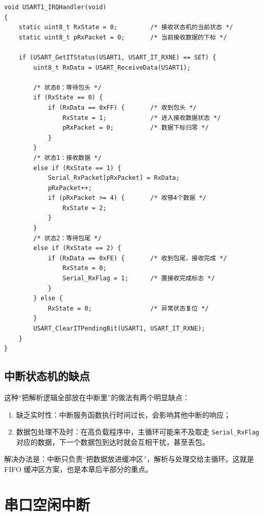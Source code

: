\begin{lstlisting}[style=c]
void USART1_IRQHandler(void)
{
    static uint8_t RxState = 0;         /* 接收状态机的当前状态 */
    static uint8_t pRxPacket = 0;       /* 当前接收数据的下标 */

    if (USART_GetITStatus(USART1, USART_IT_RXNE) == SET) {
        uint8_t RxData = USART_ReceiveData(USART1);

        /* 状态0：等待包头 */
        if (RxState == 0) {
            if (RxData == 0xFF) {       /* 收到包头 */
                RxState = 1;            /* 进入接收数据状态 */
                pRxPacket = 0;          /* 数据下标归零 */
            }
        }
        /* 状态1：接收数据 */
        else if (RxState == 1) {
            Serial_RxPacket[pRxPacket] = RxData;
            pRxPacket++;
            if (pRxPacket >= 4) {       /* 收够4个数据 */
                RxState = 2;
            }
        }
        /* 状态2：等待包尾 */
        else if (RxState == 2) {
            if (RxData == 0xFE) {       /* 收到包尾，接收完成 */
                RxState = 0;
                Serial_RxFlag = 1;      /* 置接收完成标志 */
            }
        } else {
            RxState = 0;                /* 异常状态复位 */
        }
        USART_ClearITPendingBit(USART1, USART_IT_RXNE);
    }
}
\end{lstlisting}
\subsection{中断状态机的缺点}

这种“把解析逻辑全部放在中断里”的做法有两个明显缺点：

\begin{enumerate}
\item 缺乏实时性：中断服务函数执行时间过长，会影响其他中断的响应；
\item 数据包处理不及时：在高负载程序中，主循环可能来不及取走 \texttt{Serial\_RxFlag} 对应的数据，下一个数据包到达时就会互相干扰，甚至丢包。
\end{enumerate}

解决办法是：中断只负责“把数据放进缓冲区”，解析与处理交给主循环。这就是 FIFO 缓冲区方案，也是本章后半部分的重点。

\section{串口空闲中断}

